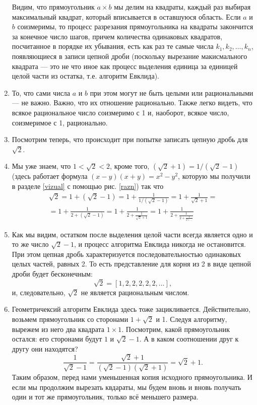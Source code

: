 \begin{enumerate}
Видим, что прямоугольник $a\times b$ мы делим на квадраты, каждый раз выбирая максимальный квадрат, который вписывается в оставшуюся область. Если $a$ и $b$ соизмеримы, то процесс разрезания прямоугольника на квадраты закончится за конечное число шагов, причем количества одинаковых квадратов, посчитанное в порядке их убывания, есть как раз те самые числа $k_1,k_2,\dots,k_n$, появляющиеся в записи цепной дроби (поскольку вырезание макисмального квадрата --- это не что иное как процесс выделения единица за единицей целой части из остатка, т.е. алгоритм Евклида).
\item То, что сами числа $a$ и $b$ при этом могут не быть целыми или рациональными --- не важно. Важно, что их отношение рационально. Также легко видеть, что всякое рациональное число соизмеримо с 1 и, наоборот, всякое число, соизмеримое с 1, рационально.
\item Посмотрим теперь, что происходит при попытке записать цепную дробь для $\sqrt 2$.
\item Мы уже знаем, что $1<\sqrt 2<2$, кроме того, $(\sqrt 2+1)=1/(\sqrt 2-1)$ (здесь работает формула $(x-y)(x+y)=x^2-y^2$, которую мы получили в разделе \ref{vizual} с помощью рис. \ref{razn}) так что
\begin{multline*}
\sqrt 2 = \boxed{1} + (\sqrt 2-1) = \boxed{1} + \frac{1}{1/(\sqrt 2-1)} = 
\boxed{1} + \frac{1}{\sqrt 2+1} = \\ 
= \boxed{1} + \frac{1}{\boxed{2} + (\sqrt 2-1)} = 
\boxed{1} + \frac{1}{\boxed{2} + \frac{1}{\sqrt 2+1}} = 
\boxed{1} + \frac{1}{\boxed{2} + \frac{1}{\boxed{2} + \frac{1}{\boxed{2} + \dots}}}
\end{multline*}
\item Как мы видим, остатком после выделения целой части всегда является одно и то же число $\sqrt 2-1$, и процесс алгоритма Евклида никогда не остановится. При этом цепная дробь характеризуется последовательностью одинаковых целых частей, равных 2. То есть представление для корня из 2 в виде цепной дроби будет бесконечным:
$$
\sqrt 2 = [1,2,2,2,2,2,\dots],
$$
и, следовательно, $\sqrt 2$ не является рациональным числом.
\item Геометричексий алгоритм Евклида здесь тоже зацикливается. Действительно, возьмем прямоугольник со сторонами $1+\sqrt 2$ и 1. Следуя алгоритму, вырежем из него два квадрата $1\times 1$. Посмотрим, какой прямоугольник остался: его сторонами будут $1$ и $\sqrt 2-1$. А в каком соотношении друг к другу они находятся?
$$
\frac{1}{\sqrt 2-1}=\frac{\sqrt{2}+1}{(\sqrt 2-1)(\sqrt 2+1)}=\sqrt 2+1.
$$
Таким образом, перед нами уменьшенная копия исходного прямоугольника. И если мы продолжим вырезать квдараты, мы будем вновь и вновь получать один и тот же прямоугольник, только всё меньшего размера.





\end{enumerate}
